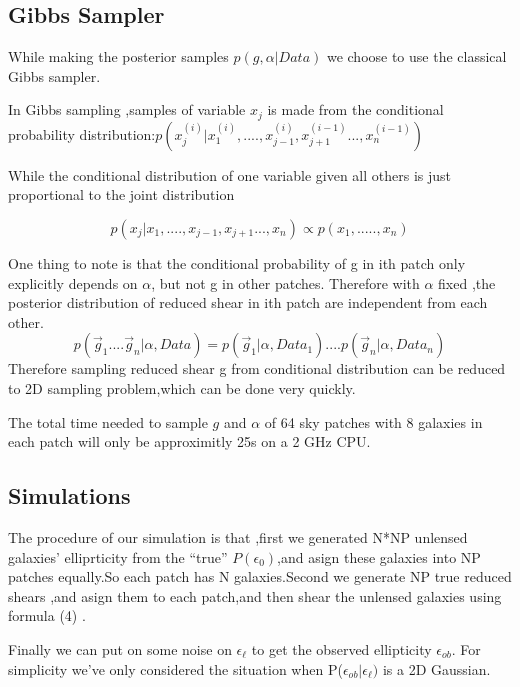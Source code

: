 \documentclass[useAMS,usenatbib]{mn2e}
\begin{document}
\subsection{Gibbs Sampler}

While making the posterior samples $p(g,\alpha|Data)$ we choose to
use the classical Gibbs sampler.

In Gibbs sampling ,samples of variable $x_{j}$ is made from the conditional
probability distribution:$p(x_{j}^{(i)}|x_{1}^{(i)},....,x_{j-1}^{(i)},x_{j+1}^{(i-1)}...,x_{n}^{(i-1)})$

While the conditional distribution of one variable given all others
is just proportional to the joint distribution

\begin{equation}
p(x_{j}|x_{1},....,x_{j-1},x_{j+1}...,x_{n})\varpropto p(x_{1},.....,x_{n})
\end{equation}


One thing to note is that the conditional probability of g in ith
patch only explicitly depends on $\alpha$, but not g in other patches. Therefore
with $\alpha$ fixed ,the posterior distribution of reduced shear
in ith patch are independent from each other. 
\begin{equation}
p(\vec{g}_{1}....\vec{g}_{n}|\alpha,Data)=p(\vec{g}_{1}|\alpha,Data_{1})....p(\vec{g}_{n}|\alpha,Data_{n})
\end{equation}
Therefore sampling reduced shear g from conditional distribution can
be reduced to 2D sampling problem,which can be done very quickly.

The total time needed to sample $g$ and $\alpha$ of 64 sky patches
with 8 galaxies in each patch will only be approximitly 25s on a 2
GHz CPU.


\subsection{Simulations}

The procedure of our simulation is that ,first we generated N{*}NP
unlensed galaxies' elliprticity from the ``true'' $P(\epsilon_{0})$,and
asign these galaxies into NP patches equally.So each patch has N galaxies.Second
we generate NP true reduced shears ,and asign them to each patch,and
then shear the unlensed galaxies using formula (4) .

Finally we can put on some noise on $\epsilon_{\ell}$ to get the
observed ellipticity $\epsilon_{ob}$. For simplicity we've only considered
the situation when P($\epsilon_{ob}|\epsilon_{\ell})$ is a 2D Gaussian.
\end{document}
